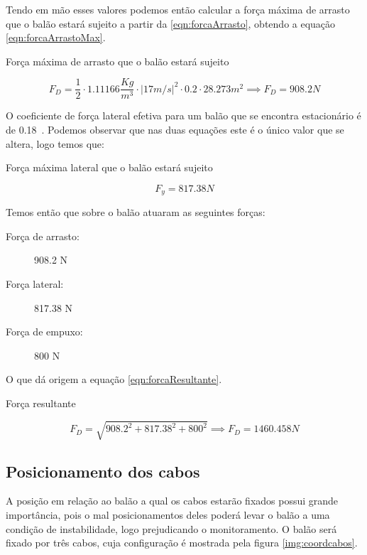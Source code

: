 	Tendo em mão esses valores podemos então calcular a força máxima de arrasto que o balão estará sujeito a partir da \eqref{eqn:forcaArrasto}, obtendo a equação \eqref{eqn:forcaArrastoMax}.

	\begin{equacao}[htp]
	\caption{Força máxima de arrasto que o balão estará sujeito}
		\begin{equation}
			F_{D} = \frac{1}{2} \cdot 1.11166 \frac{Kg}{m^{3}} \cdot \left | 17m/s \right |^{2} \cdot 0.2 \cdot 28.273m^{2} \implies F_{D} = 908.2 N
		\end{equation}
		\label{eqn:forcaArrastoMax}
	\end{equacao}

	O coeficiente de força lateral efetiva para um balão que se encontra estacionário é de 0.18~\cite{ferguson}. Podemos observar que nas duas equações este é o único valor que se altera, logo temos que:

	\begin{equacao}[htp]
	\caption{Força máxima lateral que o balão estará sujeito}
		\begin{equation}
			F_y = 817.38 N
		\end{equation}
		\label{eqn:forcaLateralMax}
	\end{equacao}

	Temos então que sobre o balão atuaram as seguintes forças:

	\begin{description}
		\item[Força de arrasto:] 908.2 N
		\item[Força lateral:] 817.38 N
		\item[Força de empuxo:] 800 N
	\end{description}

	O que dá origem a equação \eqref{eqn:forcaResultante}.

	\begin{equacao}
	\caption{Força resultante}
		\begin{equation}
			F_D = \sqrt{908.2^2 + 817.38^2 + 800^2} \implies F_D = 1460.458 N
		\end{equation}
		\label{eqn:forcaResultante}
	\end{equacao}

\subsection{Posicionamento dos cabos}

	A posição em relação ao balão a qual os cabos estarão fixados possui grande importância, pois o mal posicionamentos deles poderá levar o balão a uma condição de instabilidade, logo prejudicando o monitoramento. O balão será fixado por três cabos, cuja  configuração é mostrada pela figura \ref{img:coordcabos}.

